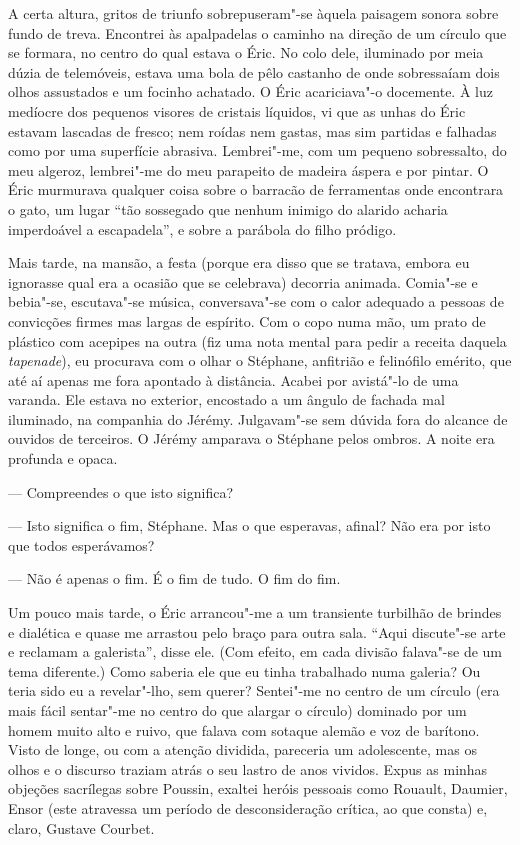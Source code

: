 A certa altura, gritos de triunfo sobrepuseram"-se àquela
paisagem sonora sobre fundo de treva. Encontrei às apalpadelas o
caminho na direção de um círculo que se formara, no centro do qual
estava o Éric. No colo dele, iluminado por meia dúzia de telemóveis,
estava uma bola de pêlo castanho de onde sobressaíam dois olhos
assustados e um focinho achatado. O Éric acariciava"-o docemente. À luz
medíocre dos pequenos visores de cristais líquidos, vi que as unhas do
Éric estavam lascadas de fresco; nem roídas nem gastas, mas sim partidas
e falhadas como por uma superfície abrasiva. Lembrei"-me, com um pequeno
sobressalto, do meu algeroz, lembrei"-me do meu parapeito de madeira
áspera e por pintar. O Éric murmurava qualquer coisa sobre o barracão de
ferramentas onde encontrara o gato, um lugar ``tão sossegado que
nenhum inimigo do alarido acharia imperdoável a escapadela'', e sobre a
parábola do filho pródigo.

Mais tarde, na mansão, a festa (porque era disso que se tratava,
embora eu ignorasse qual era a ocasião que se celebrava) decorria
animada. Comia"-se e bebia"-se, escutava"-se música, conversava"-se com o
calor adequado a pessoas de convicções firmes mas largas de espírito.
Com o copo numa mão, um prato de plástico com acepipes na outra (fiz
uma nota mental para pedir a receita daquela \emph{tapenade}), eu
procurava com o olhar o Stéphane, anfitrião e felinófilo emérito, que
até aí apenas me fora apontado à distância. Acabei por avistá"-lo de uma
varanda. Ele estava no exterior, encostado a um ângulo de fachada mal
iluminado, na companhia do Jérémy. Julgavam"-se sem dúvida fora do
alcance de ouvidos de terceiros. O Jérémy amparava o Stéphane pelos
ombros. A noite era profunda e opaca.

--- Compreendes o que isto significa?

--- Isto significa o fim, Stéphane. Mas o que esperavas, afinal? Não era
  por isto que todos esperávamos?

--- Não é apenas o fim. É o fim de tudo. O fim do fim.

Um pouco mais
tarde, o Éric arrancou"-me a um transiente turbilhão de brindes e
dialética e quase me arrastou pelo braço
para outra sala. ``Aqui discute"-se arte e reclamam a galerista'', disse
ele. (Com efeito, em cada divisão falava"-se de um tema diferente.) Como
saberia ele que eu tinha trabalhado numa galeria? Ou teria sido eu a
revelar"-lho, sem querer? Sentei"-me no centro de um círculo (era mais
fácil sentar"-me no centro do que alargar o círculo) dominado por um
homem muito alto e ruivo, que falava com sotaque alemão e voz de
barítono. Visto de longe, ou com a atenção dividida, pareceria um
adolescente, mas os olhos e o discurso traziam atrás o seu lastro de
anos vividos. Expus as minhas objeções sacrílegas sobre Poussin,
exaltei heróis pessoais como Rouault, Daumier, Ensor (este atravessa um
período de desconsideração crítica, ao que consta) e, claro, Gustave
Courbet.


